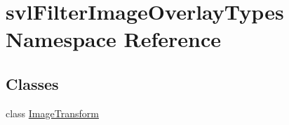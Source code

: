\hypertarget{namespacesvl_filter_image_overlay_types}{}\section{svl\+Filter\+Image\+Overlay\+Types Namespace Reference}
\label{namespacesvl_filter_image_overlay_types}
\subsection*{Classes}
\begin{DoxyCompactItemize}
\item 
class \hyperlink{classsvl_filter_image_overlay_types_1_1_image_transform}{Image\+Transform}
\end{DoxyCompactItemize}
